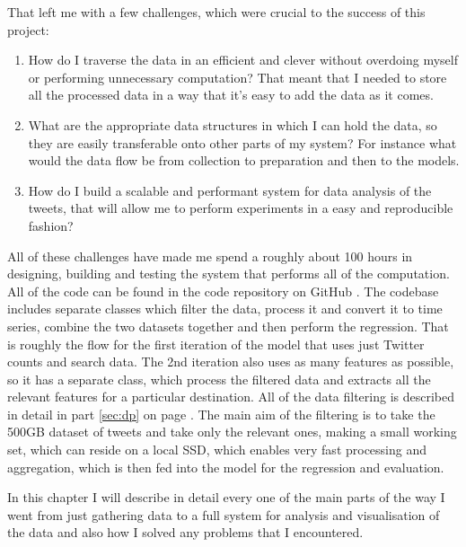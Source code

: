 \documentclass[minf,frontabs,twoside,singlespacing,parskip]{infthesis}
\begin{document}
That left me with a few challenges, which were crucial to the success of this project:
\begin{enumerate}
\item How do I traverse the data in an efficient and clever without overdoing myself or performing unnecessary computation? That meant that I needed to store all the processed data in a way that it's easy to add the data as it comes.
\item What are the appropriate data structures in which I can hold the data, so they are easily transferable onto other parts of my system? For instance what would the data flow be from collection to preparation and then to the models.
\item How do I build a scalable and performant system for data analysis of the tweets, that will allow me to perform experiments in a easy and reproducible fashion?
\end{enumerate}


All of these challenges have made me spend a roughly about 100 hours in designing, building and testing the system that performs all of the computation. All of the code can be found in the code repository on GitHub \cite{code}. The codebase includes separate classes which filter the data, process it and convert it to time series, combine the two datasets together and then perform the regression. That is roughly the flow for the first iteration of the model that uses just Twitter counts and search data. The 2nd iteration also uses as many features as possible, so it has a separate class, which process the filtered data and extracts all the relevant features for a particular destination. All of the data filtering is described in detail in part  \ref{sec:dp} on page \pageref{sec:dp}. The main aim of the filtering is to take the 500GB dataset of tweets and take only the relevant ones, making a small working set, which can reside on a local SSD, which enables very fast processing and aggregation, which is then fed into the model for the regression and evaluation. 


In this chapter I will describe in detail every one of the main parts of the way I went from just gathering data to a full system for analysis and visualisation of the data and also how I solved any problems that I encountered.

\end{document}
